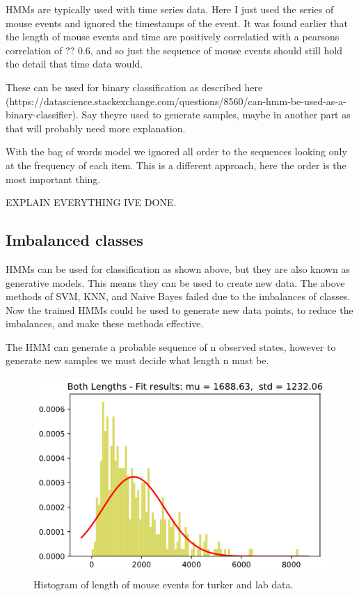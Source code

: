 \documentclass{article}
\begin{document}
HMMs are typically used with time series data.
Here I just used the series of mouse events and ignored the timestamps of the event.
It was found earlier that the length of mouse events and time are positively correlatied with a pearsons correlation of ?? 0.6,
 and so just the sequence of mouse events should still hold the detail that time data would.

These can be used for binary classification as described here 
(https://datascience.stackexchange.com/questions/8560/can-hmm-be-used-as-a-binary-classifier). Say theyre used to generate samples, maybe in another part as that will probably need more explanation.

With the bag of words model we ignored all order to the sequences looking only at the frequency of each item.
This is a different approach, here the order is the most important thing.

EXPLAIN EVERYTHING IVE DONE.

\subsection{Imbalanced classes}

HMMs can be used for classification as shown above, but they are also known as generative models.
This means they can be used to create new data.
The above methods of SVM, KNN, and Naive Bayes failed due to the imbalances of classes.
Now the trained HMMs could be used to generate new data points, to reduce the imbalances, and make these methods effective.

The HMM can generate a probable sequence of n observed states, however to generate new samples we must decide what length n must be.


\begin{figure}[ht]
    \centering
    \includegraphics[scale=0.5]{Images/Lengths-Histogram.png}
    \caption{Histogram of length of mouse events for turker and lab data.}
    \label{fig:normaldis}
\end{figure}
\end{document}
